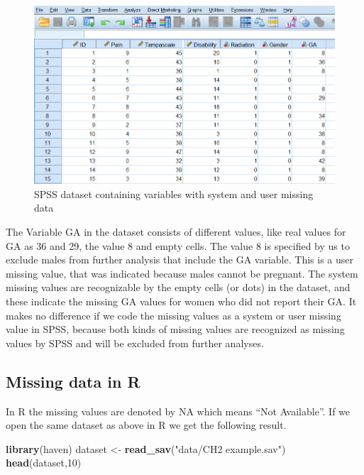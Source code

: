 \documentclass[]{book}
\newenvironment{Shaded}{\begin{snugshade}}{\end{snugshade}}
\newcommand{\KeywordTok}[1]{\textcolor[rgb]{0.13,0.29,0.53}{\textbf{#1}}}
\newcommand{\DecValTok}[1]{\textcolor[rgb]{0.00,0.00,0.81}{#1}}
\newcommand{\StringTok}[1]{\textcolor[rgb]{0.31,0.60,0.02}{#1}}
\newcommand{\NormalTok}[1]{#1}
\theoremstyle{definition}
\theoremstyle{definition}
\theoremstyle{definition}
\theoremstyle{remark}
\begin{document}
\begin{figure}

{\centering \includegraphics[width=0.9\linewidth]{images/fig2.1} 

}

\caption{SPSS dataset containing variables with system and user missing data}\label{fig:fig2-1}
\end{figure}

The Variable GA in the dataset consists of different values, like real
values for GA as 36 and 29, the value 8 and empty cells. The value 8 is
specified by us to exclude males from further analysis that include the
GA variable. This is a user missing value, that was indicated because
males cannot be pregnant. The system missing values are recognizable by
the empty cells (or dots) in the dataset, and these indicate the missing
GA values for women who did not report their GA. It makes no difference
if we code the missing values as a system or user missing value in SPSS,
because both kinds of missing values are recognized as missing values by
SPSS and will be excluded from further analyses.

\subsection{Missing data in R}\label{missing-data-in-r}

In R the missing values are denoted by NA which means ``Not Available''.
If we open the same dataset as above in R we get the following result.

\begin{Shaded}
\begin{Highlighting}[]
\KeywordTok{library}\NormalTok{(haven)}
\NormalTok{dataset <-}\StringTok{ }\KeywordTok{read_sav}\NormalTok{(}\StringTok{"data/CH2 example.sav"}\NormalTok{)}
\KeywordTok{head}\NormalTok{(dataset,}\DecValTok{10}\NormalTok{)}
\end{Highlighting}
\end{Shaded}
\end{document}
